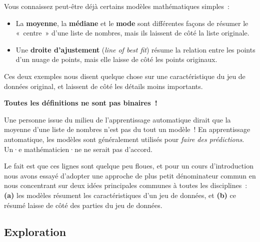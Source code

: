 \documentclass[12pt,a4paper]{article}
\newenvironment{instructornotes}{%
  \vspace{0.5em}
  \begin{tcolorbox}[colback=yellow!10!white, colframe=yellow!80!black, fonttitle=\bfseries, title=Notes pour l'enseignant·e]
}{%
  \end{tcolorbox}
  \vspace{0.5em}
}
\begin{document}
\begin{center}
\end{center}

Vous connaissez peut-être déjà certains modèles mathématiques simples~:

\begin{itemize}
  \item La \textbf{moyenne}, la \textbf{médiane} et le \textbf{mode} sont différentes façons de résumer le «~centre~» d'une liste de nombres, mais ils laissent de côté la liste originale.
  \item Une \textbf{droite d'ajustement} (\emph{line of best fit}) résume la relation entre les points d'un nuage de points, mais elle laisse de côté les points originaux.
\end{itemize}

Ces deux exemples nous disent quelque chose sur une caractéristique du jeu de données original, et laissent de côté les détails moins importants.

\begin{instructornotes}
  \textbf{Toutes les définitions ne sont pas binaires~!}

  Une personne issue du milieu de l'apprentissage automatique dirait que la moyenne d'une liste de nombres n'est pas du tout un modèle~! En apprentissage automatique, les modèles sont généralement utilisés pour \emph{faire des prédictions}. Un·e mathématicien·ne ne serait pas d'accord.

  Le fait est que ces lignes sont quelque peu floues, et pour un cours d'introduction nous avons essayé d'adopter une approche de plus petit dénominateur commun en nous concentrant sur deux idées principales communes à toutes les disciplines~: \textbf{(a)} les modèles résument les caractéristiques d'un jeu de données, et \textbf{(b)} ce résumé laisse de côté des parties du jeu de données.
\end{instructornotes}

\subsection{Exploration}
\end{document}
